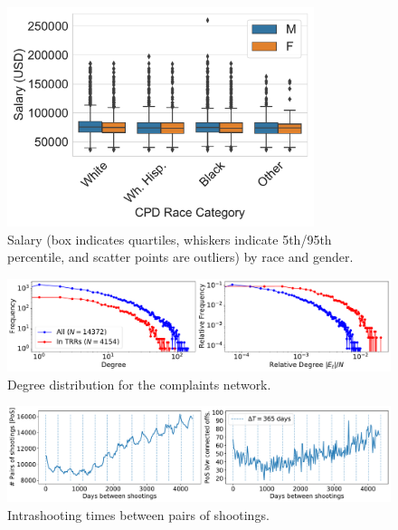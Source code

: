 \begin{figure}
	\begin{center}
	\includegraphics[width=0.8\textwidth]{figs/salary_by_race_gender} 
	\end{center}
	\caption{Salary (box indicates quartiles, whiskers indicate 5th/95th percentile, and scatter points are outliers) by race and gender.} \label{fig:salary_gender_race}
\end{figure}


\begin{figure}
	\includegraphics[width=\textwidth]{figs/degree_distribution} 
	\caption{Degree distribution for the complaints network.}
\label{fig:degree_distribution}
\end{figure}

\begin{figure}
	\includegraphics[width=\textwidth]{figs/intrashooting_times} 
	\caption{Intrashooting times between pairs of shootings.}
\label{fig:intrashooting_time}
\end{figure}




